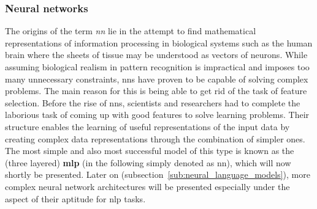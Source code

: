 \subsubsection{Neural networks}
\label{sub:neural_networks}

The origins of the term \textit{\gls{nn}} lie in the attempt to find mathematical representations of information processing in biological systems such as the human brain where the sheets of tissue may be understood as vectors of neurons. While assuming biological realism in pattern recognition is impractical and imposes too many unnecessary constraints, \gls{nn}s have proven to be capable of solving complex problems. The main reason for this is being able to get rid of the task of feature selection. Before the rise of \gls{nn}s, scientists and researchers had to complete the laborious task of coming up with good features to solve learning problems. Their structure enables the learning of useful representations of the input data by creating complex data representations through the combination of simpler ones. The most simple and also most successful model of this type is known as the (three layered) \textbf{\gls{mlp}} (in the following simply denoted as \gls{nn}), which will now shortly be presented. Later on (subsection~\ref{sub:neural_language_models}), more complex neural network architectures will be presented especially under the aspect of their aptitude for \gls{nlp} tasks.

